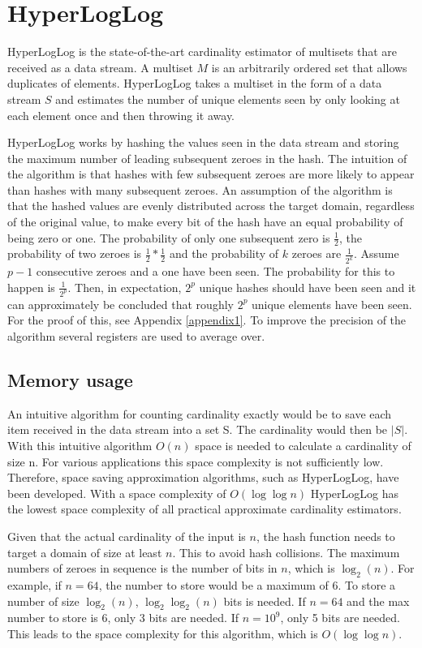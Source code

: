 \section{HyperLogLog}
HyperLogLog is the state-of-the-art cardinality estimator of multisets that are received as a data stream. A multiset $M$ is an arbitrarily ordered set that allows duplicates of elements. HyperLogLog takes a multiset in the form of a data stream $S$ and estimates the number of unique elements seen by only looking at each element once and then throwing it away. 

HyperLogLog works by hashing the values seen in the data stream and storing the maximum number of leading subsequent zeroes in the hash. The intuition of the algorithm is that hashes with few subsequent zeroes are more likely to appear than hashes with many subsequent zeroes. An assumption of the algorithm is that the hashed values are evenly distributed across the target domain, regardless of the original value, to make every bit of the hash have an equal probability of being zero or one. The probability of only one subsequent zero is $\frac{1}{2}$, the probability of two zeroes is $\frac{1}{2}*\frac{1}{2}$ and the probability of $k$ zeroes are $\frac {1} {2^k}$. Assume $p-1$ consecutive zeroes and a one have been seen. The probability for this to happen is $\frac{1}{2^p}$. Then, in expectation, $2^p$ unique hashes should have been seen and it can approximately be concluded that roughly $2^p$ unique elements have been seen. For the proof of this, see Appendix \ref{appendix1}. To improve the precision of the algorithm several registers are used to average over. \cite{hyperloglog}

\subsection{Memory usage}
An intuitive algorithm for counting cardinality exactly would be to save each item received in the data stream into a set S. The cardinality would then be $|S|$. With this intuitive algorithm $O(n)$ space is needed to calculate a cardinality of size n. For various applications this space complexity is not sufficiently low. Therefore, space saving approximation algorithms, such as HyperLogLog, have been developed. With a space complexity of $O(\log\log n)$ HyperLogLog has the lowest space complexity of all practical approximate cardinality estimators. 

Given that the actual cardinality of the input is $n$, the hash function needs to target a domain of size at least $n$. This to avoid hash collisions. The maximum numbers of zeroes in sequence is the number of bits in $n$, which is $\log_2(n)$. For example, if $n=64$, the number to store would be a maximum of 6. To store a number of size $\log_2(n)$, $\log_2\log_2(n)$ bits is needed. If $n=64$ and the max number to store is 6, only 3 bits are needed. If $n=10^9$, only 5 bits are needed. This leads to the space complexity for this algorithm, which is $O(\log\log n)$. \cite{hyperloglog}

